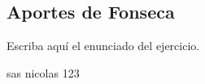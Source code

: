 \subsection{Aportes de Fonseca}


\begin{ejercicio}
Escriba aquí el enunciado del ejercicio.
\end{ejercicio}

\begin{solucion}
sas
nicolas 123

\end{solucion}
